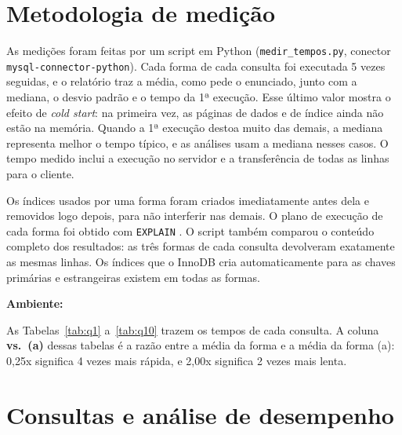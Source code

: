 \documentclass[10pt,a4paper]{article}
\begin{document}

\section{Metodologia de medição}\label{sec:metodologia}

As medições foram feitas por um script em Python (\texttt{medir\_tempos.py}, conector \texttt{mysql-connector-python}). Cada forma de cada consulta foi executada 5 vezes seguidas, e o relatório traz a média, como pede o enunciado, junto com a mediana, o desvio padrão e o tempo da 1ª execução. Esse último valor mostra o efeito de \emph{cold start}: na primeira vez, as páginas de dados e de índice ainda não estão na memória. Quando a 1ª execução destoa muito das demais, a mediana representa melhor o tempo típico, e as análises usam a mediana nesses casos. O tempo medido inclui a execução no servidor e a transferência de todas as linhas para o cliente.

Os índices usados por uma forma foram criados imediatamente antes dela e removidos logo depois, para não interferir nas demais. O plano de execução de cada forma foi obtido com \texttt{EXPLAIN} \cite{mysql-explain}. O script também comparou o conteúdo completo dos resultados: as três formas de cada consulta devolveram exatamente as mesmas linhas. Os índices que o InnoDB cria automaticamente para as chaves primárias e estrangeiras \cite{mysql-fk} existem em todas as formas.

\textbf{Ambiente:} %

As Tabelas~\ref{tab:q1} a~\ref{tab:q10} trazem os tempos de cada consulta. A coluna \textbf{vs.\ (a)} dessas tabelas é a razão entre a média da forma e a média da forma (a): 0,25x significa 4 vezes mais rápida, e 2,00x significa 2 vezes mais lenta.

\section{Consultas e análise de desempenho}\label{sec:consultas}
\end{document}
